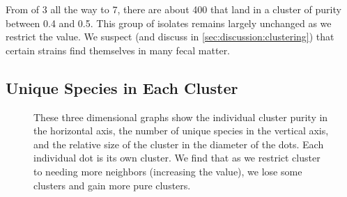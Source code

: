 From \minneigh{} of 3 all the way to 7, there are about 400 \isols{} that land in a cluster of purity between 0.4 and 0.5.  
This group of isolates remains largely unchanged as we restrict the \minneigh{} value.
We suspect (and discuss in \autoref{sec:discussion:clustering}) that certain \ecoli{} strains find themselves in many \spec{} fecal matter.

\subsection{Unique Species in Each Cluster}\label{sec:results:unique}

\begin{figure}
    \centering
    \hfill
    \hfill

    \caption{These three dimensional graphs show the individual cluster purity in the horizontal axis, the number of unique species in the vertical axis, and the relative size of the cluster in the diameter of the dots. Each individual dot is its own cluster. We find that as we restrict cluster to needing more neighbors (increasing the \minneigh{} value), we lose some clusters and gain more pure clusters.}
    \label{fig:clust_pure}
\end{figure}

